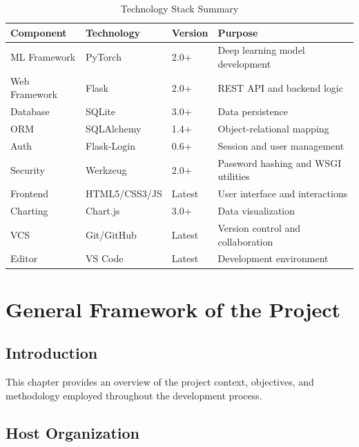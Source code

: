 \documentclass[12pt,a4paper,twoside]{report}
\begin{document}
\begin{table}[H]
    \centering
    \caption{Technology Stack Summary}
    \begin{tabular}{|l|l|l|l|}
        \hline
        \textbf{Component} & \textbf{Technology} & \textbf{Version} & \textbf{Purpose} \\
        \hline
        ML Framework & PyTorch & 2.0+ & Deep learning model development \\
        \hline
        Web Framework & Flask & 2.0+ & REST API and backend logic \\
        \hline
        Database & SQLite & 3.0+ & Data persistence \\
        \hline
        ORM & SQLAlchemy & 1.4+ & Object-relational mapping \\
        \hline
        Auth & Flask-Login & 0.6+ & Session and user management \\
        \hline
        Security & Werkzeug & 2.0+ & Password hashing and WSGI utilities \\
        \hline
        Frontend & HTML5/CSS3/JS & Latest & User interface and interactions \\
        \hline
        Charting & Chart.js & 3.0+ & Data visualization \\
        \hline
        VCS & Git/GitHub & Latest & Version control and collaboration \\
        \hline
        Editor & VS Code & Latest & Development environment \\
        \hline
    \end{tabular}
\end{table}

\chapter{General Framework of the Project}

\section{Introduction}

This chapter provides an overview of the project context, objectives, and methodology employed throughout the development process.

\section{Host Organization}
\end{document}
